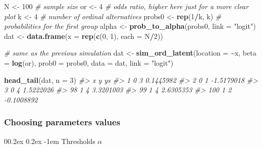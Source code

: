 \documentclass[
  man,floatsintext]{apa6}
\makeatletter
\newenvironment{Shaded}{\begin{snugshade}}{\end{snugshade}}
\newcommand{\AttributeTok}[1]{\textcolor[rgb]{0.13,0.29,0.53}{#1}}
\newcommand{\CommentTok}[1]{\textcolor[rgb]{0.56,0.35,0.01}{\textit{#1}}}
\newcommand{\DecValTok}[1]{\textcolor[rgb]{0.00,0.00,0.81}{#1}}
\newcommand{\FunctionTok}[1]{\textcolor[rgb]{0.13,0.29,0.53}{\textbf{#1}}}
\newcommand{\NormalTok}[1]{#1}
\newcommand{\OtherTok}[1]{\textcolor[rgb]{0.56,0.35,0.01}{#1}}
\newcommand{\SpecialCharTok}[1]{\textcolor[rgb]{0.81,0.36,0.00}{\textbf{#1}}}
\newcommand{\StringTok}[1]{\textcolor[rgb]{0.31,0.60,0.02}{#1}}
\let\oldparagraph\paragraph
\renewcommand{\paragraph}[1]{\oldparagraph{#1}\mbox{}}
\renewcommand{\paragraph}{\@startsection{paragraph}{4}{\parindent}%
  {0\baselineskip \@plus 0.2ex \@minus 0.2ex}%
  {-1em}%
  {\normalfont\normalsize\bfseries\itshape\typesectitle}}
\makeatother
\begin{document}
\scriptsize

\begin{Shaded}
\begin{Highlighting}[]
\NormalTok{N }\OtherTok{\textless{}{-}} \DecValTok{100} \CommentTok{\# sample size}
\NormalTok{or }\OtherTok{\textless{}{-}} \DecValTok{4} \CommentTok{\# odds ratio, higher here just for a more clear plot}
\NormalTok{k }\OtherTok{\textless{}{-}} \DecValTok{4} \CommentTok{\# number of ordinal alternatives}
\NormalTok{probs0 }\OtherTok{\textless{}{-}} \FunctionTok{rep}\NormalTok{(}\DecValTok{1}\SpecialCharTok{/}\NormalTok{k, k) }\CommentTok{\# probabilities for the first group}
\NormalTok{alpha }\OtherTok{\textless{}{-}} \FunctionTok{prob\_to\_alpha}\NormalTok{(probs0, }\AttributeTok{link =} \StringTok{"logit"}\NormalTok{)}
\NormalTok{dat }\OtherTok{\textless{}{-}} \FunctionTok{data.frame}\NormalTok{(}\AttributeTok{x =} \FunctionTok{rep}\NormalTok{(}\FunctionTok{c}\NormalTok{(}\DecValTok{0}\NormalTok{, }\DecValTok{1}\NormalTok{), }\AttributeTok{each =}\NormalTok{ N}\SpecialCharTok{/}\DecValTok{2}\NormalTok{))}

\CommentTok{\# same as the previous simulation}
\NormalTok{dat }\OtherTok{\textless{}{-}} \FunctionTok{sim\_ord\_latent}\NormalTok{(}\AttributeTok{location =} \SpecialCharTok{\textasciitilde{}}\NormalTok{x, }\AttributeTok{beta =} \FunctionTok{log}\NormalTok{(or), }\AttributeTok{prob0 =}\NormalTok{ probs0, }\AttributeTok{data =}\NormalTok{ dat, }\AttributeTok{link =} \StringTok{"logit"}\NormalTok{)}

\FunctionTok{head\_tail}\NormalTok{(dat, }\AttributeTok{n =} \DecValTok{3}\NormalTok{)}
\CommentTok{\#\textgreater{}     x y         ys}
\CommentTok{\#\textgreater{} 1   0 3  0.1445982}
\CommentTok{\#\textgreater{} 2   0 1 {-}1.5179018}
\CommentTok{\#\textgreater{} 3   0 4  1.5222026}
\CommentTok{\#\textgreater{} 98  1 4  3.3201003}
\CommentTok{\#\textgreater{} 99  1 4  2.6305353}
\CommentTok{\#\textgreater{} 100 1 2 {-}0.1008892}
\end{Highlighting}
\end{Shaded}

\normalsize

\subsubsection{Choosing parameters values}\label{choosing-parameters-values}

\paragraph{\texorpdfstring{Thresholds \(\alpha\)}{Thresholds \textbackslash alpha}}\label{thresholds-alpha}
\end{document}
